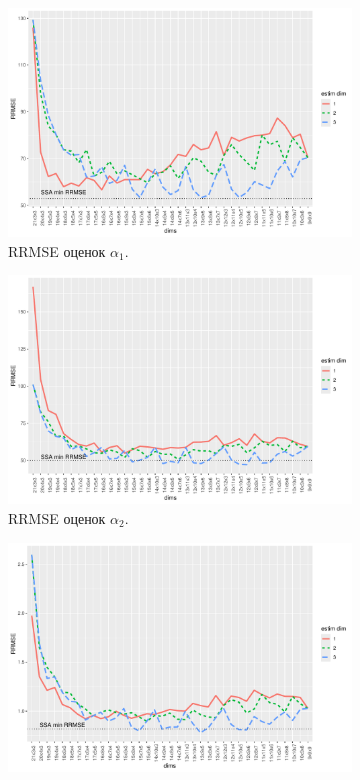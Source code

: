 \documentclass[specialist,
  substylefile=spbu.rtx,
subf,href,colorlinks=true, 12pt]{disser}
\theoremstyle{plain}
\theoremstyle{definition}
\theoremstyle{remark}
\begin{document}
\begin{figure}[!ht]
  \centering
  \begin{subfigure}{0.49\linewidth}
    \includegraphics[width=\linewidth]{rate1_dims_large_eq_rates.pdf}
    \caption{RRMSE оценок $\alpha_1$.}
    \label{fig:rate1_dims_large_eq_rates}
  \end{subfigure}
  \begin{subfigure}{0.49\linewidth}
    \includegraphics[width=\linewidth]{rate2_dims_large_eq_rates.pdf}
    \caption{RRMSE оценок $\alpha_2$.}
    \label{fig:rate2_dims_large_eq_rates}
  \end{subfigure}
  \begin{subfigure}{0.49\linewidth}
    \includegraphics[width=\linewidth]{freq1_dims_large_eq_rates.pdf}

\end{subfigure}
\end{figure}
\end{document}
